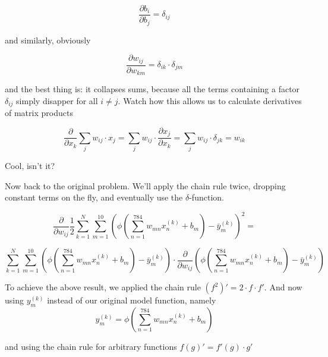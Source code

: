 \documentclass[]{report}
\begin{document}
\begin{equation}\label{eq:110}
\frac{\partial b_i}{\partial b_j} = \delta_{ij}
\end{equation}

and similarly, obviously

\begin{equation}\label{eq:120}
\frac{\partial w_{ij}}{\partial w_{km}} = \delta_{ik} \cdot \delta_{jm}
\end{equation}

and the best thing is: it collapses sums, because all the terms containing a factor \(\delta_{ij}\) simply disapper for all \(  i \neq j\). Watch how this allows us to calculate derivatives of matrix products

\begin{equation}\label{eq:130}
\frac{\partial}{\partial x_k} \sum_j w_{ij} \cdot x_j = \sum_j w_{ij} \cdot \frac{\partial x_j}{\partial x_k}
=\sum_j w_{ij} \cdot \delta_{jk} = w_{ik}
\end{equation}

Cool, isn't it?

\bigskip


Now back to the original problem. We'll apply the chain rule twice, dropping constant terms on the fly, and eventually use the \(\delta \)-function.

\begin{equation}\label{eq:140}
	\frac{\partial}{\partial w_{ij}}   \frac{1}{2} \sum_{k=1}^N \sum_{m=1}^{10} ( \phi(\sum_{n=1}^{784} w_{mn} x^{(k)}_n + b_m) - \bar{y}_m^{(k)})^2 =
\end{equation}



\begin{equation}\label{eq:150}
 \sum_{k=1}^N \sum_{m=1}^{10}
(\phi(\sum_{n=1}^{784} w_{mn} x^{(k)}_n + b_m) - \bar{y}_m^{(k)})
\cdot
\frac{\partial}{\partial w_{ij}}
(\phi(\sum_{n=1}^{784} w_{mn} x^{(k)}_n + b_m) - \bar{y}_m^{(k)})
\end{equation}

To achieve the above result, we applied the chain rule \((f^2)' = 2 \cdot f \cdot f' \). And now using \( y^{(k)}_m\) instead of our original model function, namely
\begin{equation}
y^{(k)}_m = \phi(\sum_{n=1}^{784} w_{mn} x^{(k)}_n + b_m)
\end{equation}

and using the chain rule for arbitrary functions \( f(g)' = f'(g) \cdot g' \)
\end{document}
